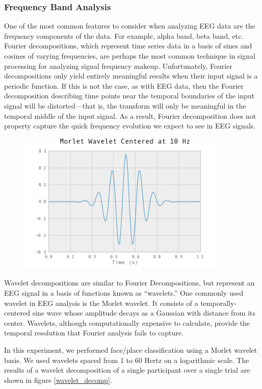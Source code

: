 \documentclass[11pt]{report}
\begin{document}
\subsubsection{Frequency Band Analysis}
	One of the most common features to consider when analyzing EEG data are the frequency components of the data.  For example, alpha band, beta band, etc.   Fourier decompositions, which represent time series data in a basis of sines and cosines of varying frequencies, are perhaps the most common technique in signal processing for analyzing signal frequency makeup.  Unfortunately, Fourier decompositions only yield entirely meaningful results when their input signal is a periodic function.   If this is not the case, as with EEG data, then the Fourier decomposition describing time points near the temporal boundaries of the input signal will be distorted—that is, the transform will only be meaningful in the temporal middle of the input signal.  As a result, Fourier decomposition does not property capture the quick frequency evolution we expect to see in EEG signals.  

\begin{figure}[t]
\centering
\includegraphics[width=4in]{morletwavelet}
\end{figure}


Wavelet decompositions are similar to Fourier Decompositions, but represent an EEG signal in a basis of functions known as “wavelets.”  One commonly used wavelet in EEG analysis is the Morlet wavelet.  It consists of a temporally-centered sine wave whose amplitude decays as a Gaussian with distance from its center.  Wavelets, although computationally expensive to calculate, provide the temporal resolution that Fourier analysis fails to capture.  

	In this experiment, we performed face/place classification using a Morlet wavelet basis.  We used wavelets spaced from 1 to 60 Hertz on a logarithmic scale.  The results of a wavelet decomposition of a single participant over a single trial are shown in figure \ref{wavelet_decomp}.  
\end{document}
